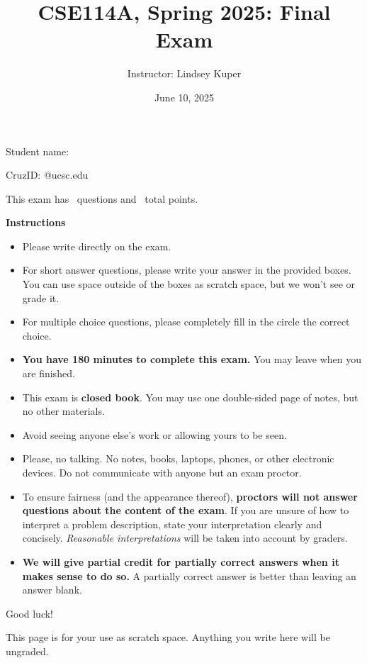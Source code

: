 \documentclass[addpoints]{exam}
\title{CSE114A, Spring 2025: Final Exam}
\author{Instructor: Lindsey Kuper}
\date{June 10, 2025}
\begin{document}
\maketitle

\begin{coverpages}

\bigskip  

\noindent Student name: \hrulefill

\bigskip
\bigskip

\noindent CruzID: \hrulefill @ucsc.edu

\bigskip
\bigskip

\noindent This exam has \numquestions~questions and \numpoints~total points.

\bigskip
\bigskip

\noindent \textbf{Instructions}

\begin{itemize}
\item Please write directly on the exam.
\item For short answer questions, please write your answer in the provided boxes.  You can use space outside of the boxes as scratch space, but we won't see or grade it.
\item For multiple choice questions, please completely fill in the circle the correct choice.
\item \textbf{You have 180 minutes to complete this exam.} You may leave when you are finished.
\item This exam is \textbf{closed book}.  You may use one double-sided page of notes, but no other materials.
\item Avoid seeing anyone else's work or allowing yours to be seen.
\item Please, no talking.  No notes, books, laptops, phones, or other electronic devices. Do not communicate with anyone but an exam proctor.
\item To ensure fairness (and the appearance thereof),
  \textbf{proctors will not answer questions about the content of the exam}. If you are unsure 
  of how to interpret a problem description, state your interpretation clearly and concisely. 
  \textit{Reasonable interpretations} will be taken into account by graders.
\item \textbf{We will give partial credit for partially correct answers when it makes sense to do so.} A partially correct answer is better than leaving an answer blank.
\end{itemize}

\bigskip

\noindent Good luck!

\newpage

This page is for your use as scratch space. Anything you write here will be ungraded.

\newpage

\end{coverpages}
\end{document}
